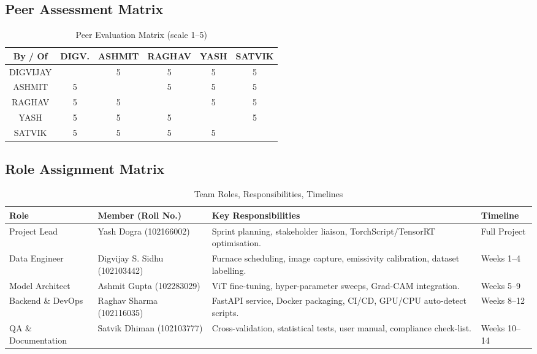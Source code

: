 \subsection{Peer Assessment Matrix}

\begin{table}[H]
\centering\footnotesize
\caption{Peer Evaluation Matrix (scale 1–5)}
\begin{tabular}{|c|c|c|c|c|c|}
\hline
\textbf{By / Of} & \textbf{DIGV.} & \textbf{ASHMIT} & \textbf{RAGHAV} & \textbf{YASH} & \textbf{SATVIK} \\ \hline
DIGVIJAY &  & 5 & 5 & 5 & 5 \\ \hline
ASHMIT   & 5 &  & 5 & 5 & 5 \\ \hline
RAGHAV   & 5 & 5 &  & 5 & 5 \\ \hline
YASH     & 5 & 5 & 5 &  & 5 \\ \hline
SATVIK   & 5 & 5 & 5 & 5 &  \\ \hline
\end{tabular}
\end{table}

\subsection{Role Assignment Matrix}

\begin{table}[H]
\centering\footnotesize
\caption{Team Roles, Responsibilities, Timelines}
\begin{tabular}{|p{2.3cm}|p{2.8cm}|p{7cm}|p{2cm}|}
\hline
\textbf{Role} & \textbf{Member (Roll No.)} & \textbf{Key Responsibilities} & \textbf{Timeline} \\ \hline
Project Lead & Yash Dogra (102166002) & Sprint planning, stakeholder liaison, TorchScript/TensorRT optimisation. & Full Project \\ \hline
Data Engineer & Digvijay S. Sidhu (102103442) & Furnace scheduling, image capture, emissivity calibration, dataset labelling. & Weeks 1–4 \\ \hline
Model Architect & Ashmit Gupta (102283029) & ViT fine-tuning, hyper-parameter sweeps, Grad-CAM integration. & Weeks 5–9 \\ \hline
Backend \& DevOps & Raghav Sharma (102116035) & FastAPI service, Docker packaging, CI/CD, GPU/CPU auto-detect scripts. & Weeks 8–12 \\ \hline
QA \& Documentation & Satvik Dhiman (102103777) & Cross-validation, statistical tests, user manual, compliance check-list. & Weeks 10–14 \\ \hline
\end{tabular}
\end{table}

